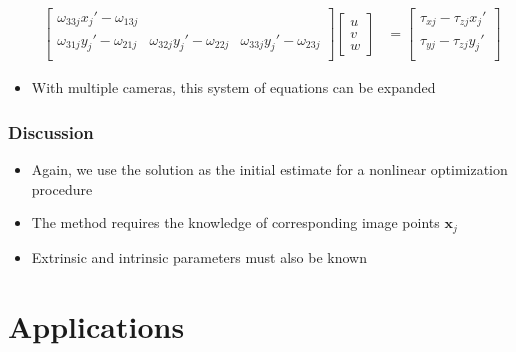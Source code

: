 \documentclass{beamer}
\begin{document}
\begin{frame}
\begin{itemize}[<+->]
{\begin{align*}
\begin{bmatrix}
            \omega_{33j}x_j'-\omega_{13j} \\
            \omega_{31j}y_j'-\omega_{21j} &
            \omega_{32j}y_j'-\omega_{22j} &
            \omega_{33j}y_j'-\omega_{23j} \\
          \end{bmatrix}
          \begin{bmatrix}
            u \\ v \\ w
          \end{bmatrix}
          &=
          \begin{bmatrix}
            \tau_{xj}-\tau_{zj}x_j' \\
            \tau_{yj}-\tau_{zj}y_j' \\
          \end{bmatrix}
        \end{align*}
      }
    \item With multiple cameras, this system of equations can be expanded
  \end{itemize}
\end{frame}

\begin{frame}
  \frametitle{Discussion}
  \begin{itemize}[<+->]
    \item Again, we use the solution as the initial estimate for a nonlinear
      optimization procedure
    \item The method requires the knowledge of corresponding image points
      $\mathbf{x}_j$
    \item Extrinsic and intrinsic parameters must also be known
  \end{itemize}
\end{frame}

\section{Applications}
\end{document}
